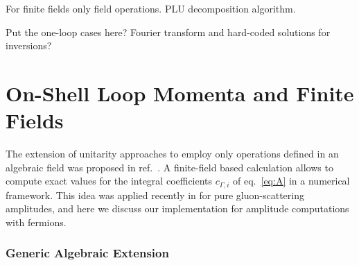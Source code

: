 For finite fields only field operations. PLU decomposition algorithm.

Put the one-loop cases here? Fourier transform and hard-coded solutions for inversions?

\section{On-Shell Loop Momenta and Finite Fields}
The extension of unitarity approaches to employ only operations
defined in an algebraic field was proposed 
in ref.~\cite{Peraro:2016wsq}.
A finite-field based calculation allows to compute exact values
for the integral coefficients $c_{\Gamma,i}$ of eq.~\eqref{eq:A}
in a numerical framework.
This idea
was applied recently in \cite{Badger:2017jhb,Abreu:2017hqn} for
pure gluon-scattering amplitudes, and here we discuss our
implementation for amplitude computations with fermions.

\subsubsection{Generic Algebraic Extension}

